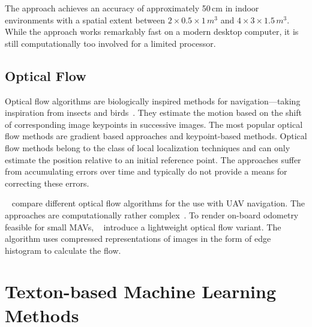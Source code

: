 \documentclass{report}
\begin{document}
The approach achieves an accuracy of approximately 50\,cm in indoor
environments with a spatial extent between $2 \times 0.5 \times 1\,m^3$
and $4 \times 3 \times 1.5\,m^3$. While the approach works remarkably
fast on a modern desktop computer, it is still computationally too
involved for a limited processor.


\subsection{Optical Flow}
\label{sec:opticalflow}

Optical flow algorithms are biologically inspired methods for
navigation---taking inspiration from insects and
birds~\cite{ruffier2003bio}. They estimate the motion based on the
shift of corresponding image keypoints in successive images. The most
popular optical flow methods are gradient based approaches and
keypoint-based methods.
Optical flow methods belong to the class of local localization
techniques and can only estimate the position relative to an initial
reference point. The approaches suffer from accumulating errors over
time and typically do not provide a means for correcting these errors.

\citeauthor{chao2013survey}~\cite{chao2013survey} compare different
optical flow algorithms for the use with UAV navigation. The
approaches are computationally rather
complex~\cite{mcguire2016local}. To render on-board odometry feasible
for small MAVs, \citeauthor{mcguire2016local}~\cite{mcguire2016local}
introduce a lightweight optical flow variant. The algorithm uses
compressed representations of images in the form of edge histogram to
calculate the flow. 

\section{Texton-based Machine Learning Methods}
\label{sec:textonbasedapproaches}
\end{document}
